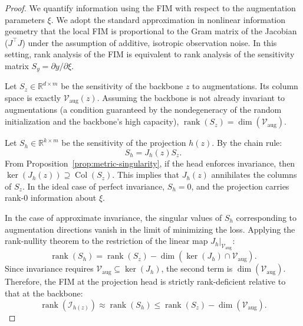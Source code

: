 \documentclass{article}
\theoremstyle{plain}
\theoremstyle{definition}
\theoremstyle{remark}
\begin{document}
\begin{proof}
We quantify information using the FIM with respect to the augmentation parameters $\xi$. We adopt the standard approximation in nonlinear information geometry that the local FIM is proportional to the Gram matrix of the Jacobian ($J^\top J$) under the assumption of additive, isotropic observation noise. In this setting, rank analysis of the FIM is equivalent to rank analysis of the sensitivity matrix $S_y = \partial y / \partial \xi$.

Let $S_z \in \mathbb{R}^{d \times m}$ be the sensitivity of the backbone $z$ to augmentations. Its column space is exactly $\mathcal{V}_{\text{aug}}(z)$. Assuming the backbone is not already invariant to augmentations (a condition guaranteed by the nondegeneracy of the random initialization and the backbone's high capacity), $\operatorname{rank}(S_z) = \dim(\mathcal{V}_{\text{aug}})$.

Let $S_h \in \mathbb{R}^{k \times m}$ be the sensitivity of the projection $h(z)$. By the chain rule:
\begin{equation*}
    S_h = J_h(z) S_z.
\end{equation*}
From Proposition~\ref{prop:metric-singularity}, if the head enforces invariance, then $\ker(J_h(z)) \supseteq \operatorname{Col}(S_z)$.
This implies that $J_h(z)$ annihilates the columns of $S_z$. In the ideal case of perfect invariance, $S_h = 0$, and the projection carries rank-0 information about $\xi$.

In the case of approximate invariance, the singular values of $S_h$ corresponding to augmentation directions vanish in the limit of minimizing the loss. Applying the rank-nullity theorem to the restriction of the linear map $J_h|_{\mathcal{V}_{\text{aug}}}$:
\begin{equation*}
    \operatorname{rank}(S_h) = \operatorname{rank}(S_z) - \dim(\ker(J_h) \cap \mathcal{V}_{\text{aug}}).
\end{equation*}
Since invariance requires $\mathcal{V}_{\text{aug}} \subseteq \ker(J_h)$, the second term is $\dim(\mathcal{V}_{\text{aug}})$.
Therefore, the FIM at the projection head is strictly rank-deficient relative to that at the backbone:
\begin{equation*}
    \operatorname{rank}(\mathcal{I}_{h(z)}) \approx \operatorname{rank}(S_h) \le \operatorname{rank}(S_z) - \dim(\mathcal{V}_{\text{aug}}).
\end{equation*}
\end{proof}
\end{document}
